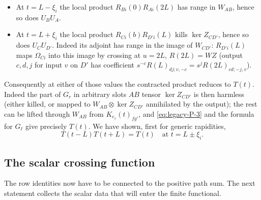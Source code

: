 \begin{itemize}

\item 

At $t=L-\xi_i$ the local product $R_{Bi}(0) R_{Ai}(2L)$ has range in $W_{AB}$, hence so does $U_B U_A$.

\item 

At $t=L+\xi_i$ the local product $R_{Ci}(b) R_{D'i}(L)$ kills $\ker Z_{C D'}$, hence so does $U_C U_{D'}$. Indeed its adjoint has range in the image of $W_{C D'}$: $R_{D'i}(L)$ maps $\Omega_{Ci}$ into this image by crossing at $u=2L$, $R(2L)=WZ$ (output $c,d,j$ for input $v$ on $D'$ has coefficient $s^{-c}R(L)_{dj;v,-c}=s^j R(2L)_{cd;-j,v}$).

\end{itemize}

Consequently at either of those values the contracted product reduces to $T(t)$. Indeed the part of $G_r$ in arbitrary slots $AB$ tensor $\ker Z_{CD'}$ is then harmless (either killed, or mapped to $W_{AB}\otimes\ker Z_{CD'}$ annihilated by the output); the rest can be lifted through $W_{AB}$ from $K_{e_r}(t)_{f g'}$, and \eqref{eq:legacy-P-3} and the formula for $G_\ell$ give precisely $T(t)$. We have shown, first for generic rapidities,
\begin{equation}
 T(t-L)T(t+L)=T(t)\quad\text{at }t=L\pm\xi_i.                     \label{eq:legacy-P-6}
\end{equation}

\subsection{The scalar crossing function}\label{sec:strip-scalar}

The row identities now have to be connected to the positive path sum. The next statement collects the scalar data that will enter the finite functional.

